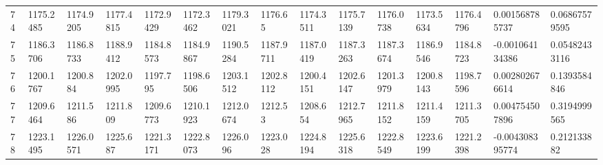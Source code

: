 \begin{landscape}
{\begin{longtable}{@{}lllllllllllllll@{}}
		74                                           & 1175.2485                & 1174.9205                & 1177.4815                & 1172.9429                & 1172.3462                & 1179.3021                & 1176.65                  & 1174.3511                & 1175.7139                & 1176.0738                & 1173.5634                & 1176.4796                & 0.001568785737                                                         & 0.06867579595                                   \\
		75                                           & 1186.3706                & 1186.8733                & 1188.9412                & 1184.8573                & 1184.9867                & 1190.5284                & 1187.9711                & 1187.0419                & 1187.3263                & 1187.3674                & 1186.9546                & 1184.8723                & -0.001064134386                                                        & 0.05482433116                                   \\
		76                                           & 1200.1767                & 1200.884                 & 1202.0995                & 1197.795                 & 1198.6506                & 1203.1512                & 1202.8112                & 1200.4151                & 1202.6147                & 1201.3979                & 1200.8143                & 1198.7596                & 0.002802676614                                                         & 0.1393584846                                    \\
		77                                           & 1209.6464                & 1211.586                 & 1211.809                 & 1209.6773                & 1210.1923                & 1212.0674                & 1212.53                  & 1208.654                 & 1212.7965                & 1211.8152                & 1211.4159                & 1211.3705                & 0.004754507896                                                         & 0.3194999565                                    \\
		78                                           & 1223.1495                & 1226.0571                & 1225.687                 & 1221.3171                & 1222.8073                & 1226.096                 & 1223.028                 & 1224.8194                & 1225.6318                & 1222.8549                & 1223.6199                & 1221.2398                & -0.004308395774                                                        & 0.212133882                                     \\

\end{longtable}}
\end{landscape}
